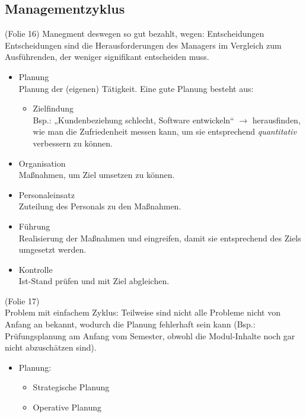 \subsection{Managementzyklus}
(Folie 16)
Manegment deswegen so gut bezahlt, wegen: Entscheidungen\\
Entscheidungen sind die Herausforderungen des Managers im Vergleich zum Ausführenden, der weniger signifikant entscheiden muss.
\begin{itemize}
\item Planung\\
Planung der (eigenen) Tätigkeit. Eine gute Planung besteht aus:
\begin{itemize}
\item Zielfindung\\
Bsp.: „Kundenbeziehung schlecht, Software entwickeln“ $\rightarrow$ herausfinden, wie man die Zufriedenheit messen kann, um sie entsprechend \emph{quantitativ} verbessern zu können.
\end{itemize}
\item Organisation\\
Maßnahmen, um Ziel umsetzen zu können.
\item Personaleinsatz\\
Zuteilung des Personals zu den Maßnahmen.
\item Führung\\
Realisierung der Maßnahmen und eingreifen, damit sie entsprechend des Ziels umgesetzt werden.
\item Kontrolle\\
Ist-Stand prüfen und mit Ziel abgleichen.
\end{itemize}
(Folie 17)\\
Problem mit einfachem Zyklus: Teilweise sind nicht alle Probleme nicht von Anfang an bekannt, wodurch die Planung fehlerhaft sein kann (Bsp.: Prüfungsplanung am Anfang vom Semester, obwohl die Modul-Inhalte noch gar nicht abzuschätzen sind).
\begin{itemize}
\item Planung:
\begin{itemize}
\item Strategische Planung
\item Operative Planung
\end{itemize}
\end{itemize}

